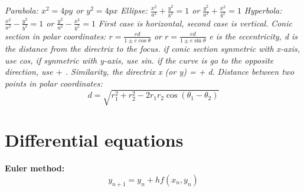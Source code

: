 \documentclass{article}
\begin{document}
\textit{Parabola: $x^2 = 4py$ or $y^2 = 4px$}\newline 
\textit{Ellipse: $\frac{x^2}{a^2} + \frac{y^2}{b^2} = 1$ \newline
or $\frac{y^2}{a^2} + \frac{x^2}{b^2} = 1$} \newline
\textit{Hyperbola: $\frac{x^2}{a^2} - \frac{y^2}{b^2} = 1$ \newline
or $\frac{y^2}{a^2} - \frac{x^2}{b^2} = 1$}\newline 
\textit{First case is horizontal, second case is vertical.}\newline
\textit{Conic section in polar coordinates: $r = \frac{ed}{1 \pm e \cos \theta}$}\newline
\textit{or $r = \frac{ed}{1 \pm e \sin \theta}$}\newline
\textit{e is the eccentricity, d is the distance from the directrix to the focus. if conic section synmetric with x-axis, use cos, if synmetric with y-axis, use sin.
if the curve is go to the opposite direction, use $+$ . Similarity, the directrix x (or y) = + d.} \newline
\textit{Distance between two points in polar coordinates: } \[d = \sqrt{r_1^2 + r_2^2 - 2r_1r_2 \cos(\theta_1 - \theta_2)}\]
\section{Differential equations}
\textbf{Euler method: } \[y_{n+1} = y_n + h f(x_n, y_n)\]
\end{document}
